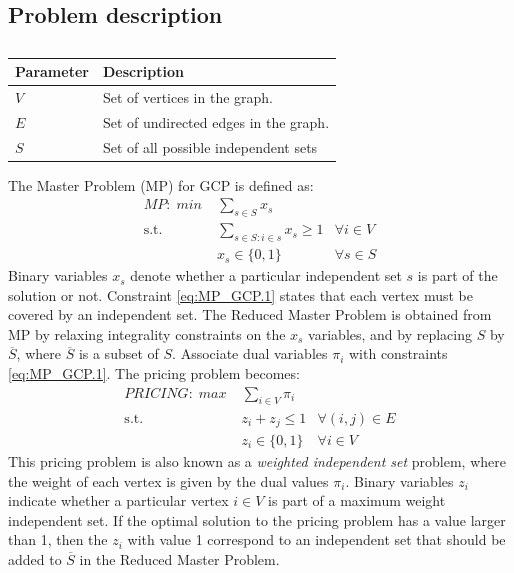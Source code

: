 \documentclass[a4paper]{article}
\begin{document}
\subsection{Problem description}
\begin{table}[h]
\begin{tabular}{ll}
\toprule
\textbf{Parameter} 	& \textbf{Description}\\
\midrule
$V$		& Set of vertices in the graph.\\
$E$		& Set of undirected edges in the graph.\\
$S$		& Set of all possible independent sets\\
\bottomrule
\end{tabular}
\caption{}
\label{tbl:gcp} 
\end{table}

The Master Problem (MP) for GCP is defined as:
\begin{align}
\label{eq:MP_GCP.0} \mathit{MP:}\; min\; &\sum_{s\in S} x_s &\\
\label{eq:MP_GCP.1} \mbox{s.t. }&\sum_{s \in S: i\in s} x_s \geq 1 & \forall i\in V\\
\label{eq:MP_GCP.5} &x_s\in \{0,1\} &\forall s\in S
\end{align}
Binary variables $x_s$ denote whether a particular independent set $s$ is part of the solution or not. Constraint \eqref{eq:MP_GCP.1} states that each vertex must be covered by an independent set. The Reduced Master Problem is obtained from MP by relaxing integrality constraints on the $x_s$ variables, and by replacing $S$ by $\overline{S}$, where $\overline{S}$ is a subset of $S$.
Associate dual variables $\pi_i$ with constraints \eqref{eq:MP_GCP.1}. The pricing problem becomes:
\begin{align}
\label{eq:PRICE_GCP.0} \mathit{PRICING:}\; max\; &\sum_{i\in V} \pi_i &\\
\label{eq:PRICE_GCP.1} \mbox{s.t. }&z_i+z_j \leq 1 & \forall (i,j)\in E\\
\label{eq:PRICE_GCP.5} &z_i\in \{0,1\} &\forall i\in V
\end{align}
This pricing problem is also known as a \emph{weighted independent set} problem, where the weight of each vertex is given by the dual values $\pi_i$. Binary variables $z_i$ indicate whether a particular vertex $i\in V$ is part of a maximum weight independent set. If the optimal solution to the pricing problem has a value larger than 1, then the $z_i$ with value 1 correspond to an independent set that should be added to $\overline{S}$ in the Reduced Master Problem.\\
\end{document}
